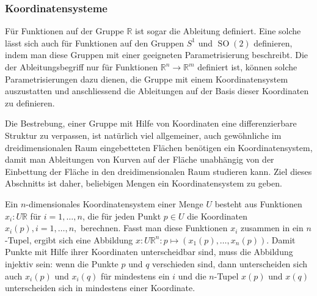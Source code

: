 %
%
\subsubsection{Koordinatensysteme}
Für Funktionen auf der Gruppe $\mathbb{R}$ ist sogar die Ableitung
definiert.
Eine solche lässt sich auch für Funktionen auf den Gruppen 
$S^1$ und $\operatorname{SO}(2)$ definieren, indem man diese Gruppen
mit einer geeigneten Parametrisierung beschreibt.
Die der Ableitungsbegriff nur für Funktionen $\mathbb{R}^n \to\mathbb{R}^m$
definiert ist, können solche Parametrisierungen dazu dienen,
die Gruppe mit einem Koordinatensystem auszustatten und anschliessend
die Ableitungen auf der Basis dieser Koordinaten zu definieren.

Die Bestrebung, einer Gruppe mit Hilfe von Koordinaten eine differenzierbare
Struktur zu verpassen, ist natürlich viel allgemeiner, auch
gewöhnliche im dreidimensionalen Raum eingebetteten Flächen
benötigen ein Koordinatensystem, damit man Ableitungen von Kurven
auf der Fläche unabhängig von der Einbettung der Fläche in den
dreidimensionalen Raum studieren kann.
Ziel dieses Abschnitts ist daher, beliebigen Mengen ein Koordinatensystem
zu geben.

Ein $n$-dimensionales Koordinatensystem einer Menge $U$ besteht
aus Funktionen $x_i\colon U\mathbb{R}$ für $i=1,\dots,n$, die für
jeden Punkt $p\in U$ die Koordinaten $x_i(p),i=1,\dots,n,$ berechnen.
Fasst man diese Funktionen $x_i$ zusammen in ein $n$-Tupel, ergibt
sich eine Abbildung $x\colon U\mathbb{R}^n:p\mapsto (x_1(p),\dots,x_n(p))$.
Damit Punkte mit Hilfe ihrer Koordinaten unterscheidbar sind, muss
die Abbildung injektiv sein: wenn die Punkte $p$ und $q$ verschieden sind,
dann unterscheiden sich auch $x_i(p)$ und $x_i(q)$ für mindestens ein $i$
und die $n$-Tupel $x(p)$ und $x(q)$ unterscheiden sich in mindestens
einer Koordinate.

